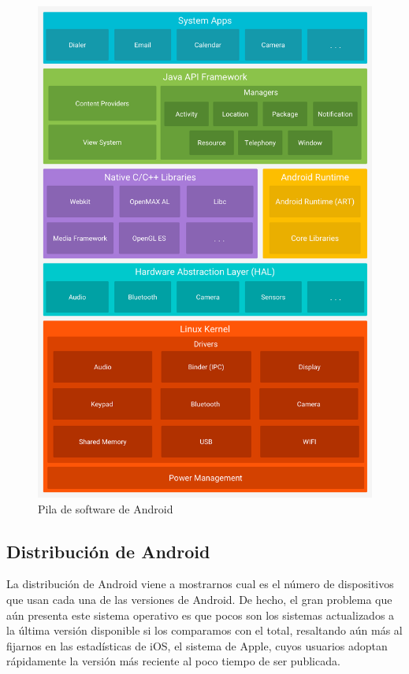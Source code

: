 \begin{figure}[H]
	\centering
	\includegraphics[scale=0.25]{imagenes/android-stack_2x.png}
	\caption{Pila de software de Android\cite{arquitecturaAndroid}\label{fig:arquitectura}}
\end{figure}

\subsection{Distribución de Android}
La distribución de Android viene a mostrarnos cual es el número de dispositivos que usan cada una de las versiones de Android. De hecho, el gran problema que aún presenta este sistema operativo es que pocos son los sistemas actualizados a la última versión disponible si los comparamos con el total, resaltando aún más al fijarnos en las estadísticas de iOS, el sistema de Apple, cuyos usuarios adoptan rápidamente la versión más reciente al poco tiempo de ser publicada. 

